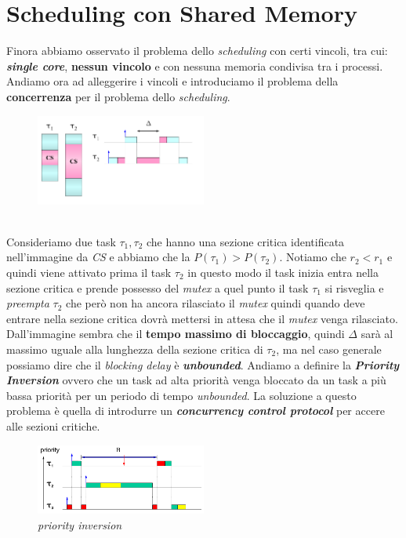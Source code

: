 \chapter{Scheduling con Shared Memory}
Finora abbiamo osservato il problema dello \textit{scheduling} con certi vincoli, tra cui: \textbf{\textit{single core}}, \textbf{nessun vincolo} e con nessuna memoria condivisa tra i processi. Andiamo ora ad alleggerire i vincoli e introduciamo il problema della \textbf{concerrenza} per il problema dello \textit{scheduling}.
\begin{figure}[h]
    \centering
    \includegraphics[width=0.5\textwidth]{img/conc_sched_1}
\end{figure}
\\
Consideriamo due task $\tau_1, \tau_2$ che hanno una sezione critica identificata nell'immagine da \textit{CS} e abbiamo che la $P(\tau_1) > P(\tau_2)$. Notiamo che $r_2 < r_1$ e quindi viene attivato prima il task $\tau_2$ in questo modo il task inizia entra nella sezione critica e prende possesso del \textit{mutex} a quel punto il task $\tau_1$ si risveglia e \textit{preempta} $\tau_2$ che però non ha ancora rilasciato il \textit{mutex} quindi quando deve entrare nella sezione critica dovrà mettersi in attesa che il \textit{mutex} venga rilasciato. Dall'immagine sembra che il \textbf{tempo massimo di bloccaggio}, quindi $\Delta$ sarà al massimo uguale alla lunghezza della sezione critica di $\tau_2$, ma nel caso generale possiamo dire che il \textit{blocking delay} è \textbf{\textit{unbounded}}. Andiamo a definire la \textbf{\textit{Priority Inversion}} ovvero che un task ad alta priorità venga bloccato da un task a più bassa priorità per un periodo di tempo \textit{unbounded}. La soluzione a questo problema è quella di introdurre un \textbf{\textit{concurrency control protocol}} per accere alle sezioni critiche.
\begin{figure}[h]
    \centering
    \includegraphics[width=0.5\textwidth]{img/conc_sched_2}
    \caption{\textit{priority inversion}}
\end{figure}

